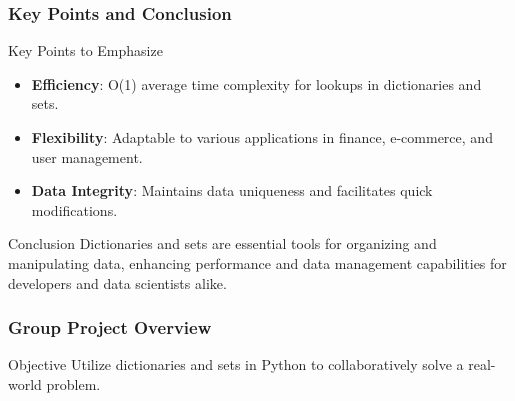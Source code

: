 \documentclass{beamer}
\begin{document}
\begin{frame}
    \frametitle{Key Points and Conclusion}
    \begin{block}{Key Points to Emphasize}
        \begin{itemize}
            \item \textbf{Efficiency}: O(1) average time complexity for lookups in dictionaries and sets.
            \item \textbf{Flexibility}: Adaptable to various applications in finance, e-commerce, and user management.
            \item \textbf{Data Integrity}: Maintains data uniqueness and facilitates quick modifications.
        \end{itemize}
    \end{block}
    
    \begin{block}{Conclusion}
        Dictionaries and sets are essential tools for organizing and manipulating data, enhancing performance and data management capabilities for developers and data scientists alike.
    \end{block}
\end{frame}

\begin{frame}
    \frametitle{Group Project Overview}
    \begin{block}{Objective}
        Utilize dictionaries and sets in Python to collaboratively solve a real-world problem.
    \end{block}
\end{frame}
\end{document}
